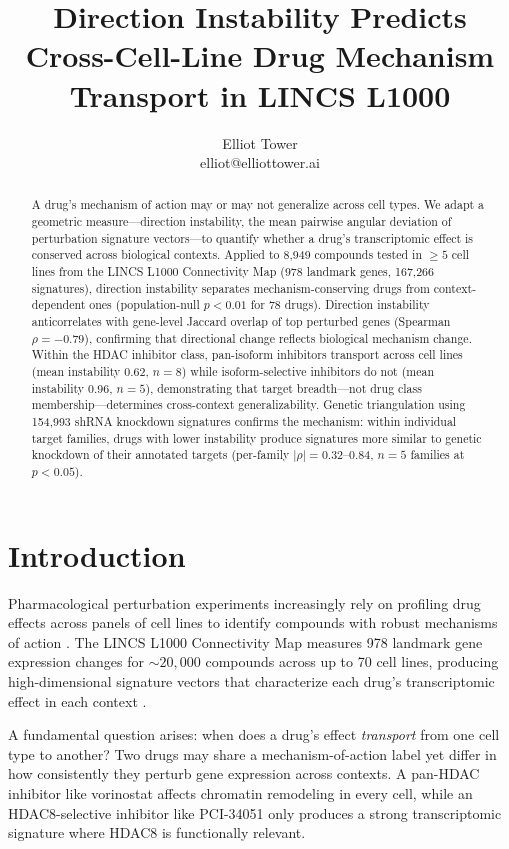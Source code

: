 \documentclass{article}
\title{Direction Instability Predicts Cross-Cell-Line Drug Mechanism Transport in LINCS L1000}
\author{\name Elliot Tower \\
      \email elliot@elliottower.ai}
\begin{document}
\maketitle

\begin{abstract}
A drug's mechanism of action may or may not generalize across cell types.
We adapt a geometric measure---direction instability, the mean pairwise
angular deviation of perturbation signature vectors---to quantify whether
a drug's transcriptomic effect is conserved across biological contexts.
Applied to 8{,}949 compounds tested in $\geq5$ cell lines from the LINCS
L1000 Connectivity Map (978 landmark genes, 167{,}266 signatures), direction
instability separates mechanism-conserving drugs from context-dependent ones
(population-null $p<0.01$ for 78 drugs). Direction instability anticorrelates
with gene-level Jaccard overlap of top perturbed genes (Spearman
$\rho=-0.79$), confirming that directional change reflects biological
mechanism change. Within the HDAC inhibitor class, pan-isoform inhibitors
transport across cell lines (mean instability 0.62, $n=8$) while
isoform-selective inhibitors do not (mean instability 0.96, $n=5$),
demonstrating that target breadth---not drug class membership---determines
cross-context generalizability. Genetic triangulation using 154{,}993
shRNA knockdown signatures confirms the mechanism: within individual
target families, drugs with lower instability produce signatures more
similar to genetic knockdown of their annotated targets (per-family
$|\rho| = 0.32$--$0.84$, $n = 5$ families at $p < 0.05$).
\end{abstract}

\section{Introduction}

Pharmacological perturbation experiments increasingly rely on profiling drug
effects across panels of cell lines to identify compounds with robust
mechanisms of action \citep{subramanian2017next}. The LINCS L1000 Connectivity
Map measures 978 landmark gene expression changes for ${\sim}20{,}000$
compounds across up to 70 cell lines, producing high-dimensional signature
vectors that characterize each drug's transcriptomic effect in each context
\citep{subramanian2017next}.

A fundamental question arises: when does a drug's effect \emph{transport}
from one cell type to another? Two drugs may share a mechanism-of-action
label yet differ in how consistently they perturb gene expression across
contexts. A pan-HDAC inhibitor like vorinostat affects chromatin remodeling
in every cell, while an HDAC8-selective inhibitor like PCI-34051 only
produces a strong transcriptomic signature where HDAC8 is functionally
relevant.
\end{document}
